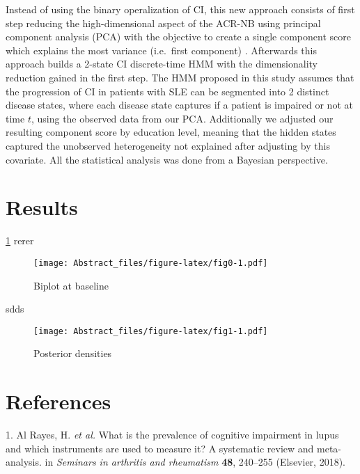 \documentclass[
]{article}
\begin{document}
Instead of using the binary operalization of CI, this new approach consists of first step reducing the high-dimensional aspect of the ACR-NB using principal component analysis (PCA) with the objective to create a single component score which explains the most variance (i.e.~first component) . Afterwards this approach builds a 2-state CI discrete-time HMM with the dimensionality reduction gained in the first step. The HMM proposed in this study assumes that the progression of CI in patients with SLE can be segmented into 2 distinct disease states, where each disease state captures if a patient is impaired or not at time \(t\), using the observed data from our PCA. Additionally we adjusted our resulting component score by education level, meaning that the hidden states captured the unobserved heterogeneity not explained after adjusting by this covariate. All the statistical analysis was done from a Bayesian perspective.

\hypertarget{results}{%
\section{Results}\label{results}}

\ref{fig:fig0} rerer

\begin{figure}
\centering
\texttt{[image: Abstract\_files/figure-latex/fig0-1.pdf]}
\caption{\label{fig:fig0}Biplot at baseline}
\end{figure}

sdds

\begin{figure}
\centering
\texttt{[image: Abstract\_files/figure-latex/fig1-1.pdf]}
\caption{\label{fig:fig1}Posterior densities}
\end{figure}

\hypertarget{references}{%
\section*{References}\label{references}}

\hypertarget{refs}{}
\leavevmode\hypertarget{ref-al2018prevalence}{}%
1. Al Rayes, H. \emph{et al.} What is the prevalence of cognitive impairment in lupus and which instruments are used to measure it? A systematic review and meta-analysis. in \emph{Seminars in arthritis and rheumatism} \textbf{48}, 240--255 (Elsevier, 2018).
\end{document}
